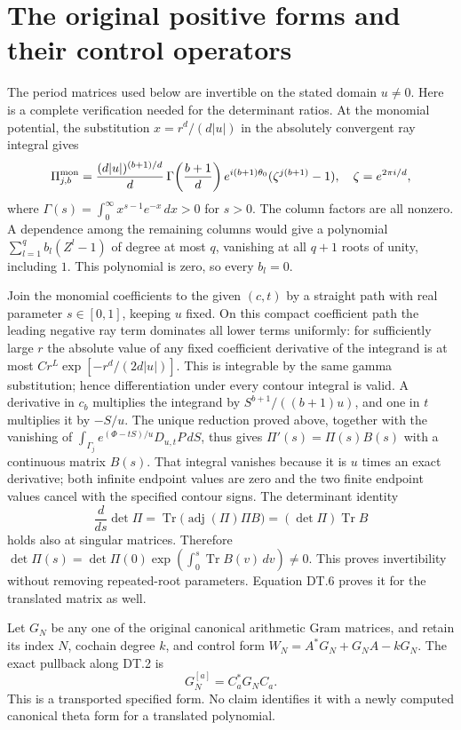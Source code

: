 \documentclass[11pt,a4paper]{article}
\newcommand{\Tr}{\operatorname{Tr}}
\begin{document}
\section{The original positive forms and their control operators}
The period matrices used below are invertible on the stated domain
\(u\ne0\). Here is a complete verification needed for the determinant
ratios. At the monomial potential, the substitution
\(x=r^d/(d|u|)\) in the absolutely convergent ray integral gives
\[
 \Pi^{\rm mon}_{j,b}
 =\frac{(d|u|)^{(b+1)/d}}d\,
   \Gamma\!\left(\frac{b+1}{d}\right)e^{i(b+1)\theta_0}
   (\zeta^{j(b+1)}-1),\quad \zeta=e^{2\pi i/d},
\]
where \(\Gamma(s)=\int_0^\infty x^{s-1}e^{-x}\,dx>0\) for
\(s>0\). The column factors are all nonzero. A dependence among
the remaining columns would give a polynomial
\(\sum_{l=1}^q b_l(Z^l-1)\) of degree at most \(q\), vanishing
at all \(q+1\) roots of unity, including \(1\). This polynomial
is zero, so every \(b_l=0\).

Join the monomial coefficients to the given \((c,t)\) by a straight
path with real parameter \(s\in[0,1]\), keeping \(u\) fixed.
On this compact coefficient path the leading negative ray term
dominates all lower terms uniformly: for sufficiently large \(r\)
the absolute value of any fixed coefficient derivative of the
integrand is at most \(Cr^L\exp[-r^d/(2d|u|)]\).
This is integrable by the same gamma substitution; hence
differentiation under every contour integral is valid. A derivative
in \(c_b\) multiplies the integrand by
\(S^{b+1}/((b+1)u)\), and one in \(t\) multiplies it by \(-S/u\).
The unique reduction proved above, together with the vanishing of
\(\int_{\Gamma_j}e^{(\Phi-tS)/u}D_{u,t}P\,dS\), thus gives
\(\Pi'(s)=\Pi(s)B(s)\) with a continuous matrix \(B(s)\).
That integral vanishes because it is \(u\) times an exact derivative;
both infinite endpoint values are zero and the two finite endpoint
values cancel with the specified contour signs. The determinant
identity
\[
 \frac d{ds}\det\Pi
 =\Tr\bigl(\operatorname{adj}(\Pi)\Pi B\bigr)
 =(\det\Pi)\Tr B
\]
holds also at singular matrices. Therefore
\(\det\Pi(s)=\det\Pi(0)\exp(\int_0^s\Tr B(v)\,dv)\ne0\).
This proves invertibility without removing repeated-root parameters.
Equation DT.6 proves it for the translated matrix as well.

Let \(G_N\) be any one of the original canonical arithmetic Gram
matrices, and retain its index \(N\), cochain degree \(k\), and control
form \(W_N=A^*G_N+G_NA-kG_N\). The exact pullback along DT.2 is
\begin{equation}\tag{DT.7}
 G_N^{[a]}=C_a^*G_NC_a.
\end{equation}
This is a transported specified form. No claim identifies it with a
newly computed canonical theta form for a translated polynomial.
\end{document}
